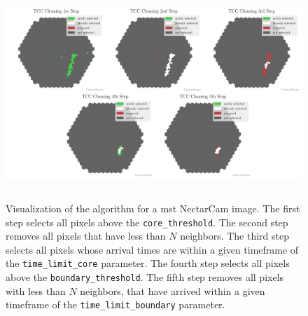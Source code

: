 \begin{figure}
    \centering
    \includegraphics[height=8cm]{plots/cleaner_steps/tcc.pdf}
    \caption{Visualization of the \tcc{} algorithm for a \gls{mst} NectarCam image. The first step
    selects all pixels above the \texttt{core\_threshold}. The second step removes all pixels that have less than
    \(N\) neighbors. The third step selects all pixels whose arrival times are within a given timeframe of the
    \texttt{time\_limit\_core} parameter. The fourth step selects all pixels above the \texttt{boundary\_threshold}.
    The fifth step removes all pixels with less than \(N\) neighbors, that have arrived within a given timeframe
    of the \texttt{time\_limit\_boundary} parameter.}
    \label{fig:tcc_cleaning}
\end{figure}
\vspace{-0.5cm}
